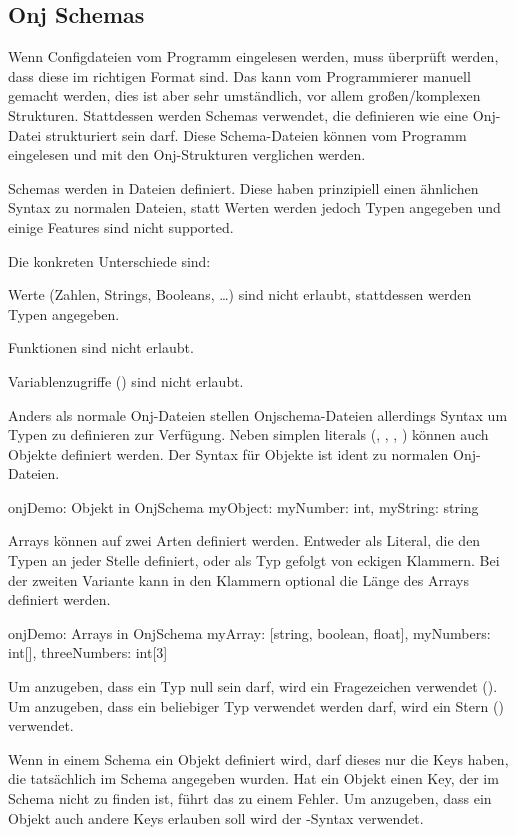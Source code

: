
\subsection{Onj Schemas}\label{subsec:onj-schemas}

\renewcommand{\kapitelautor}{Autor: Marvin Kurka}

Wenn Configdateien vom Programm eingelesen werden, muss überprüft werden, dass diese im richtigen Format sind.
Das kann vom Programmierer manuell gemacht werden, dies ist aber sehr umständlich, vor allem großen/komplexen Strukturen.
Stattdessen werden Schemas verwendet, die definieren wie eine Onj-Datei strukturiert sein darf.
Diese Schema-Dateien können vom Programm eingelesen und mit den Onj-Strukturen verglichen werden.

Schemas werden in  Dateien definiert.
Diese haben prinzipiell einen ähnlichen Syntax zu normalen  Dateien, statt Werten werden jedoch
Typen angegeben und einige Features sind nicht supported.

Die konkreten Unterschiede sind:
\begin{liste}
    \item Werte (\zB Zahlen, Strings, Booleans, \ldots) sind nicht erlaubt, stattdessen werden Typen angegeben.
    \item Funktionen sind nicht erlaubt.
    \item Variablenzugriffe () sind nicht erlaubt.
\end{liste}

Anders als normale Onj-Dateien stellen Onjschema-Dateien allerdings Syntax um Typen zu definieren zur Verfügung.
Neben simplen literals (, , , ) können auch
Objekte definiert werden.
Der Syntax für Objekte ist ident zu normalen Onj-Dateien.

\begin{codeBlock}{onj}{Demo: Objekt in OnjSchema}
myObject: {
    myNumber: int,
    myString: string
}
\end{codeBlock}

Arrays können auf zwei Arten definiert werden.
Entweder als Literal, die den Typen an jeder Stelle definiert, oder als Typ gefolgt von eckigen Klammern.
Bei der zweiten Variante kann in den Klammern optional die Länge des Arrays definiert werden.

\begin{codeBlock}{onj}{Demo: Arrays in OnjSchema}
myArray: [string, boolean, float],
myNumbers: int[],
threeNumbers: int[3]
\end{codeBlock}

Um anzugeben, dass ein Typ null sein darf, wird ein Fragezeichen verwendet ().
Um anzugeben, dass ein beliebiger Typ verwendet werden darf, wird ein Stern (\inlineOnj{*}) verwendet.

Wenn in einem Schema ein Objekt definiert wird, darf dieses nur die Keys haben, die tatsächlich im Schema angegeben
wurden.
Hat ein Objekt einen Key, der im Schema nicht zu finden ist, führt das zu einem Fehler.
Um anzugeben, dass ein Objekt auch andere Keys erlauben soll wird der -Syntax verwendet.

\renewcommand{\kapitelautor}{}
